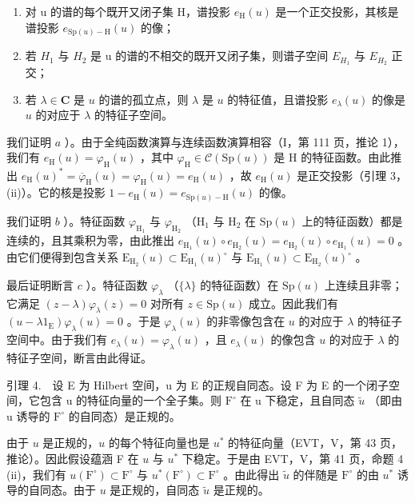 \begin{enumerate}
\def\labelenumi{\alph{enumi})}
\item
  对 u 的谱的每个既开又闭子集 H，谱投影 \(e_{\mathrm{H}}(u)\) 是一个正交投影，其核是谱投影 \(e_{\mathrm{Sp}(u)-\mathrm{H}}(u)\) 的像；
\item
  若 \(H_{1}\) 与 \(H_{2}\) 是 u 的谱的不相交的既开又闭子集，则谱子空间 \(E_{H_{1}}\) 与 \(E_{H_{2}}\) 正交；
\item
  若 \(\lambda \in \mathbf{C}\) 是 \(u\) 的谱的孤立点，则 \(\lambda\) 是 \(u\) 的特征值，且谱投影 \(e_{\lambda}(u)\) 的像是 \(u\) 的对应于 \(\lambda\) 的特征子空间。
\end{enumerate}

我们证明 \(a\) ）。由于全纯函数演算与连续函数演算相容（I，第 111 页，推论 1），我们有 \(e_{\mathrm{H}}(u) = \varphi_{\mathrm{H}}(u)\) ，其中 \(\varphi_{\mathrm{H}} \in \mathcal{C}(\mathrm{Sp}(u))\) 是 H 的特征函数。由此推出 \(e_{\mathrm{H}}(u)^{*} = \overline{\varphi}_{\mathrm{H}}(u) = \varphi_{\mathrm{H}}(u) = e_{\mathrm{H}}(u)\) ，故 \(e_{\mathrm{H}}(u)\) 是正交投影（引理 3，(ii)）。它的核是投影 \(1 - e_{\mathrm{H}}(u) = e_{\mathrm{Sp}(u) - \mathrm{H}}(u)\) 的像。

我们证明 \(b\) ）。特征函数 \(\varphi_{\mathrm{H}_{1}}\) 与 \(\varphi_{\mathrm{H}_{2}}\) （\(\mathrm{H}_{1}\) 与 \(\mathrm{H}_{2}\) 在 \(\mathrm{Sp}(u)\) 上的特征函数）都是连续的，且其乘积为零，由此推出 \(e_{\mathrm{H}_{1}}(u)\circ e_{\mathrm{H}_{2}}(u)=e_{\mathrm{H}_{2}}(u)\circ e_{\mathrm{H}_{1}}(u)=0\) 。由它们便得到包含关系 \(\mathrm{E}_{\mathrm{H}_{2}}(u)\subset\mathrm{E}_{\mathrm{H}_{1}}(u)^{\circ}\) 与 \(\mathrm{E}_{\mathrm{H}_{1}}(u)\subset\mathrm{E}_{\mathrm{H}_{2}}(u)^{\circ}\) 。

最后证明断言 \(c\) ）。特征函数 \(\varphi_{\lambda}\) （\(\{\lambda\}\) 的特征函数）在 \(\mathrm{Sp}(u)\) 上连续且非零；它满足 \((z - \lambda)\varphi_{\lambda}(z) = 0\) 对所有 \(z \in \mathrm{Sp}(u)\) 成立。因此我们有 \((u - \lambda 1_{\mathrm{E}})\varphi_{\lambda}(u) = 0\) 。于是 \(\varphi_{\lambda}(u)\) 的非零像包含在 \(u\) 的对应于 \(\lambda\) 的特征子空间中。由于我们有 \(e_{\lambda}(u) = \varphi_{\lambda}(u)\) ，且 \(e_{\lambda}(u)\) 的像包含 \(u\) 的对应于 \(\lambda\) 的特征子空间，断言由此得证。

引理 4.　设 E 为 Hilbert 空间，u 为 E 的正规自同态。设 F 为 E 的一个闭子空间，它包含 u 的特征向量的一个全子集。则 \(\mathrm{F}^{\circ}\) 在 u 下稳定，且自同态 \(\widetilde{u}\) （即由 u 诱导的 \(\mathrm{F}^{\circ}\) 的自同态）是正规的。

由于 \(u\) 是正规的，\(u\) 的每个特征向量也是 \(u^{*}\) 的特征向量（EVT，V，第 43 页，推论）。因此假设蕴涵 F 在 \(u\) 与 \(u^{*}\) 下稳定。于是由 EVT，V，第 41 页，命题 4 (ii)，我们有 \(u(\mathrm{F}^{\circ}) \subset \mathrm{F}^{\circ}\) 与 \(u^{*}(\mathrm{F}^{\circ}) \subset \mathrm{F}^{\circ}\) 。由此得出 \(\widetilde{u}\) 的伴随是 \(\mathrm{F}^{\circ}\) 的由 \(u^{*}\) 诱导的自同态。由于 \(u\) 是正规的，自同态 \(\widetilde{u}\) 是正规的。

